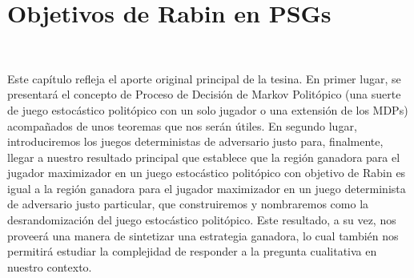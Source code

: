 \chapter{Objetivos de Rabin en PSGs}
~\label{cap:results}
\vspace{-1cm}

Este capítulo refleja el aporte original principal de la tesina. En primer
lugar, se presentará el concepto de Proceso de Decisión de Markov Politópico
(una suerte de juego estocástico politópico con un solo jugador o una extensión
de los MDPs) acompañados de unos teoremas que nos serán útiles. En segundo
lugar, introduciremos los juegos deterministas de adversario justo para,
finalmente, llegar a nuestro resultado principal que establece que la región
ganadora para el jugador maximizador en un juego estocástico politópico con
objetivo de Rabin es igual a la región ganadora para el jugador maximizador en
un juego determinista de adversario justo particular, que construiremos y
nombraremos como la desrandomización del juego estocástico politópico. Este
resultado, a su vez, nos proveerá una manera de sintetizar una estrategia
ganadora, lo cual también nos permitirá estudiar la complejidad de responder a
la pregunta cualitativa en nuestro contexto.




